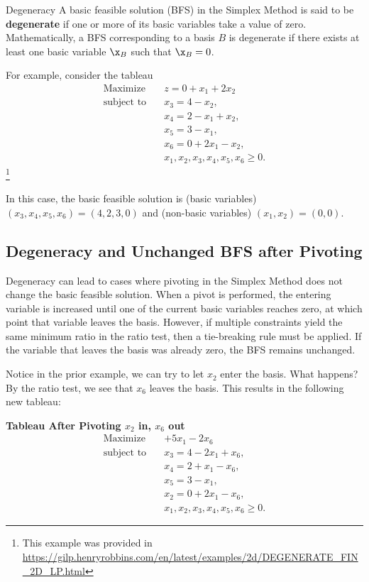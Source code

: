 \begin{definition}{Degeneracy}{}{}
A basic feasible solution (BFS) in the Simplex Method is said to be \textbf{degenerate} if one or more of its basic variables take a value of zero. Mathematically, a BFS corresponding to a basis \( B \) is degenerate if there exists at least one basic variable \( \x_B \) such that \( \x_B = 0 \).
\end{definition}

For example, consider the tableau
\[
\begin{aligned}
\text{Maximize} \quad & z = 0 + x_1 + 2x_2 \\
\text{subject to} \quad 
& x_3 = 4 - x_2, \\
& x_4 = 2 - x_1 + x_2, \\
& x_5 = 3 - x_1, \\
& x_6 = 0 + 2x_1 - x_2, \\
& x_1, x_2, x_3, x_4, x_5, x_6 \geq 0.
\end{aligned}
\]\footnote{This example was provided in \url{https://gilp.henryrobbins.com/en/latest/examples/2d/DEGENERATE_FIN_2D_LP.html}}


In this case, the basic feasible solution is (basic variables) $(x_3,x_4, x_5,x_6) = (4,2,3,0)$ and (non-basic variables) $(x_1, x_2) = (0,0)$.



\subsection{Degeneracy and Unchanged BFS after Pivoting}
Degeneracy can lead to cases where pivoting in the Simplex Method does not change the basic feasible solution. When a pivot is performed, the entering variable is increased until one of the current basic variables reaches zero, at which point that variable leaves the basis. However, if multiple constraints yield the same minimum ratio in the ratio test, then a tie-breaking rule must be applied. If the variable that leaves the basis was already zero, the BFS remains unchanged. 

Notice in the prior example, we can try to let $x_2$ enter the basis.  What happens?  By the ratio test, we see that $x_6$ leaves the basis.  This results in the following new tableau:

\textbf{Tableau After Pivoting \( x_2 \) in, \( x_6 \) out}
\[
\begin{aligned}
\text{Maximize}\quad & + 5x_1 - 2x_6 \\
\text{subject to}\quad & x_3 = 4 - 2x_1 + x_6,\\ 
& x_4 = 2 + x_1 - x_6,\\ 
& x_5 = 3 - x_1,\\ 
& x_2 = 0 + 2x_1 - x_6,\\ 
& x_1, x_2, x_3, x_4, x_5, x_6 \ge 0.
\end{aligned}
\]


